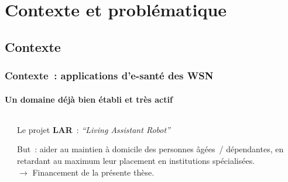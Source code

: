 \documentclass[10pt,c]{beamer}
\newcommand{\lang}[1]{\textit{#1}}
\newcommand{\nom}[1]{\textbf{#1}}
\begin{document}

\section{Contexte et problématique}


\subsection{Contexte}

\begin{frame}[label=contexte1]
\frametitle{Contexte~: applications d'e-santé des WSN}
\framesubtitle{Un domaine déjà bien établi et très actif}

\vspace{-0.5cm}

\begin{columns}[c]

\begin{column}{7cm}


\end{column}

\begin{column}{4cm}

\begin{alertblock}{Le projet \nom{LAR}~: \lang{``Living Assistant Robot''}}

But~: aider au maintien à domicile des personnes âgées~/ dépendantes,
en retardant au maximum leur placement en institutions spécialisées. \\

$\rightarrow$ Financement de la présente thèse.
\end{alertblock}

\end{column}

\end{columns}

\end{frame}
\end{document}
